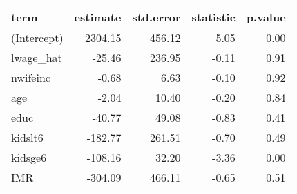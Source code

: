 \begin{tabular}{lrrrr}
  \hline
term & estimate & std.error & statistic & p.value \\ 
  \hline
(Intercept) & 2304.15 & 456.12 & 5.05 & 0.00 \\ 
  lwage\_hat & -25.46 & 236.95 & -0.11 & 0.91 \\ 
  nwifeinc & -0.68 & 6.63 & -0.10 & 0.92 \\ 
  age & -2.04 & 10.40 & -0.20 & 0.84 \\ 
  educ & -40.77 & 49.08 & -0.83 & 0.41 \\ 
  kidslt6 & -182.77 & 261.51 & -0.70 & 0.49 \\ 
  kidsge6 & -108.16 & 32.20 & -3.36 & 0.00 \\ 
  IMR & -304.09 & 466.11 & -0.65 & 0.51 \\ 
   \hline
\end{tabular}
